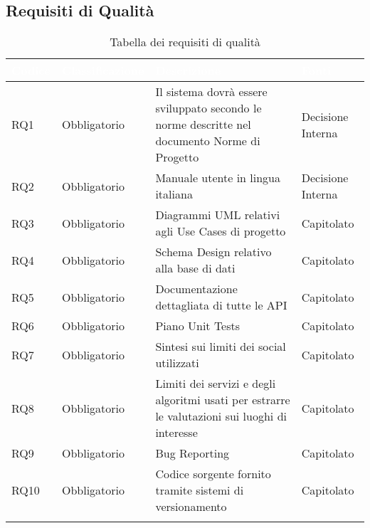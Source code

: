 \subsection{Requisiti di Qualità}
{
      \setlength{\freewidth}{\dimexpr\textwidth-10\tabcolsep}
      \renewcommand{\arraystretch}{1.5}
      \centering
      \setlength{\aboverulesep}{0pt}
      \setlength{\belowrulesep}{0pt}
      \begin{longtable}{C{.257\freewidth} C{.257\freewidth} C{.257\freewidth} C{.257\freewidth}}
         \toprule
      \textcolor{white}{\textbf{Codice}}&
      \textcolor{white}{\textbf{Classificazione}}&
      \textcolor{white}{\textbf{Descrizione}}&
      \textcolor{white}{\textbf{Fonti}}\\	
      \toprule
      \endhead
      
      RQ1 & Obbligatorio & Il sistema dovrà essere sviluppato secondo le norme descritte nel documento Norme di Progetto & Decisione Interna \\
      RQ2 & Obbligatorio & Manuale utente in lingua italiana & Decisione Interna \\
      RQ3 & Obbligatorio & Diagrammi UML relativi agli Use Cases di progetto & Capitolato \\
      RQ4 & Obbligatorio & Schema Design relativo alla base di dati & Capitolato \\
      RQ5 & Obbligatorio & Documentazione dettagliata di tutte le API & Capitolato \\
      RQ6 & Obbligatorio & Piano Unit Tests & Capitolato \\
      RQ7 & Obbligatorio & Sintesi sui limiti dei social utilizzati & Capitolato \\
      RQ8 & Obbligatorio & Limiti dei servizi e degli algoritmi usati per estrarre le valutazioni sui luoghi di interesse & Capitolato \\	   
      RQ9 & Obbligatorio & Bug Reporting & Capitolato \\
      RQ10 & Obbligatorio & Codice sorgente fornito tramite sistemi di versionamento & Capitolato \\
      \bottomrule
      \caption{Tabella dei requisiti di qualità}
      \end{longtable}
}
